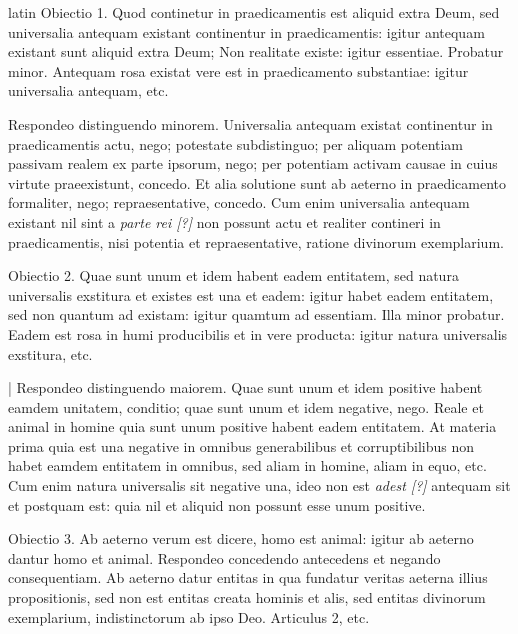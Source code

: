 \begin{otherlanguage*}{latin}
\pstart
Obiectio 1. Quod continetur in praedicamentis est aliquid extra Deum, sed universalia antequam existant continentur in praedicamentis:
igitur antequam existant sunt aliquid extra Deum; Non realitate existe:
igitur essentiae. Probatur minor. Antequam rosa existat vere est in praedicamento substantiae:
igitur universalia antequam, etc. 
\pend

\pstart
Respondeo distinguendo minorem. Universalia antequam existat continentur in praedicamentis actu, nego; potestate subdistinguo; per aliquam potentiam passivam realem ex parte ipsorum, nego; per potentiam activam causae in cuius virtute praeexistunt, concedo. Et alia solutione sunt ab aeterno in praedicamento formaliter, nego; repraesentative, concedo. Cum enim universalia antequam existant nil sint a \emph{parte rei [?]} non possunt actu et realiter contineri in praedicamentis, nisi potentia et repraesentative, ratione divinorum exemplarium. 
\pend

\pstart
Obiectio 2. Quae sunt unum et idem habent eadem entitatem, sed natura universalis exstitura et existes est una et eadem:
igitur habet eadem entitatem, sed non quantum ad existam:
igitur quamtum ad essentiam. Illa minor probatur. Eadem est rosa in humi producibilis et in vere producta:
igitur natura universalis exstitura, etc. 
\pend

\pstart
\textnormal{|} Respondeo distinguendo maiorem. Quae sunt unum et idem positive habent eamdem unitatem, conditio; quae sunt unum et idem negative, nego. Reale et animal in homine quia sunt unum positive habent eadem entitatem. At materia prima quia est una negative in omnibus generabilibus et corruptibilibus non habet eamdem entitatem in omnibus, sed aliam in homine, aliam in equo, etc. Cum enim natura universalis sit negative una, ideo non est \emph{adest [?]} antequam sit et postquam est:
quia nil et aliquid non possunt esse unum positive. 
\pend

\pstart
Obiectio 3. Ab aeterno verum est dicere, homo est animal:
igitur ab aeterno dantur homo et animal. Respondeo concedendo antecedens et negando consequentiam. Ab aeterno datur entitas in qua fundatur veritas aeterna illius propositionis, sed non est entitas creata hominis et alis, sed entitas divinorum exemplarium, indistinctorum ab ipso Deo. Articulus 2, etc. 
\pend

\pstart
{}
\pend


\end{otherlanguage*}
